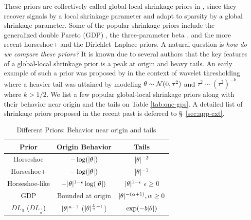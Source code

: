 \documentclass[sts,preprint]{imsart}
\begin{document}
These priors are collectively called global-local shrinkage priors in \cite{polson2010shrink}, since they recover signals by a local shrinkage parameter and adapt to sparsity by a global shrinkage parameter. Some of the popular shrinkage priors include the generalized double Pareto (GDP) \citep{armagan2013generalized}, the three-parameter beta \citep{armagan2011generalized}, and the more recent horseshoe+
\citep{bhadra2015horseshoe+} and the Dirichlet--Laplace \citep{bhattacharya2014dirichlet} priors. A natural question is \textit{how do
we compare these priors?} It is known due to several authors \citep[e.g.]{polson2010shrink,bhadra2015default,van2015conditions} that the key features of a global-local shrinkage prior is a peak at origin and heavy tails. An early example of such a prior was proposed by \citet{cutillo2008larger} in the context of wavelet thresholding where a heavier tail was attained by modeling $\theta \sim {\cal N}(
0, \tau^2)$ and $\tau^2 \sim (\tau^2)^{-k}$ where $k > 1/2$. 
We list a few popular global-local shrinkage priors along with their behavior near origin and the tails on Table \ref{tab:one-gps}. A detailed list of shrinkage priors proposed in the recent past is deferred to \S~\ref{sec:app-ext}.

\begin{table}%
\centering
\begin{tabular}{| c | c |c |}
\hline
Prior & Origin Behavior & Tails \\
\hline 
Horseshoe & $-\log(\lvert\theta\rvert)$ & $\lvert\theta\rvert^{-2}$ \\
Horseshoe+ & $-\log(\lvert\theta\rvert)$ & $\lvert\theta\rvert^{-1}$ \\
Horseshoe-like & $-\lvert\theta\rvert^{1-\epsilon}\log(\lvert\theta\rvert)$ & $\lvert\theta\rvert^{1-\epsilon}$ $\epsilon \ge 0$\\
GDP & Bounded at origin & $\lvert\theta\rvert^{-(\alpha + 1)}, \alpha \ge 0$ \\
$DL_{a}$ ($DL_{\frac{1}{n}}$) & $\lvert\theta\rvert^{a-1}$ ($\lvert\theta\rvert^{\frac{1}{n}-1}$) & $\exp(-b\lvert\theta\rvert)$ \\
\hline
\end{tabular}
\caption{Different Priors: Behavior near origin and tails}
\label{tab:priors}
\end{table}
\end{document}
